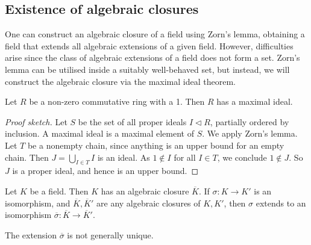 \subsection{Existence of algebraic closures}
One can construct an algebraic closure of a field using Zorn's lemma, obtaining a field that extends all algebraic extensions of a given field.
However, difficulties arise since the class of algebraic extensions of a field does not form a set.
Zorn's lemma can be utilised inside a suitably well-behaved set, but instead, we will construct the algebraic closure via the maximal ideal theorem.
\begin{theorem}
	Let \( R \) be a non-zero commutative ring with a 1.
	Then \( R \) has a maximal ideal.
\end{theorem}
\begin{proof}[Proof sketch]
	Let \( S \) be the set of all proper ideals \( I \triangleleft R \), partially ordered by inclusion.
	A maximal ideal is a maximal element of \( S \).
	We apply Zorn's lemma.
	Let \( T \) be a nonempty chain, since anything is an upper bound for an empty chain.
	Then \( J = \bigcup_{I \in T} I \) is an ideal.
	As \( 1 \not\in I \) for all \( I \in T \), we conclude \( 1 \not\in J \).
	So \( J \) is a proper ideal, and hence is an upper bound.
\end{proof}
\begin{theorem}
	Let \( K \) be a field.
	Then \( K \) has an algebraic closure \( \overline K \).
	If \( \sigma \colon K \to K' \) is an isomorphism, and \( \overline K, \overline K' \) are any algebraic closures of \( K, K' \), then \( \sigma \) extends to an isomorphism \( \overline \sigma \colon \overline K \to \overline K' \).
\end{theorem}
\begin{remark}
	The extension \( \overline \sigma \) is not generally unique.
\end{remark}
